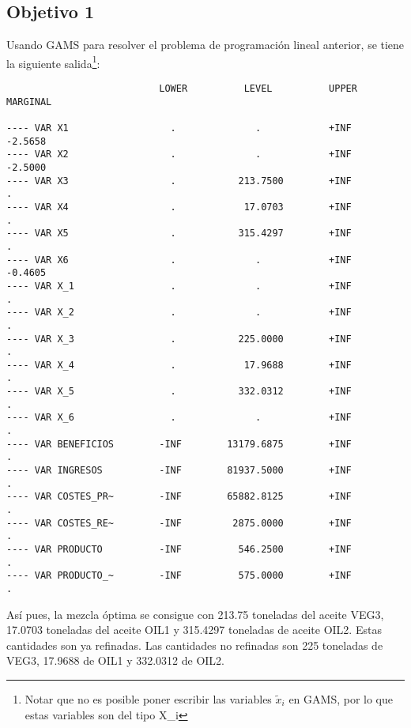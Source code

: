 \documentclass[12pt,a4paper,twoside,openright,titlepage,final]{article}
\begin{document}
\subsection{Objetivo 1}

Usando GAMS para resolver el problema de programación lineal anterior, se tiene la siguiente salida\footnote{Notar que no es posible poner escribir las variables $\tilde{x}_i$ en GAMS, por lo que estas variables son del tipo X\_i}:

\begin{verbatim}
                           LOWER          LEVEL          UPPER         MARGINAL

---- VAR X1                  .              .            +INF           -2.5658      
---- VAR X2                  .              .            +INF           -2.5000      
---- VAR X3                  .           213.7500        +INF             .          
---- VAR X4                  .            17.0703        +INF             .          
---- VAR X5                  .           315.4297        +INF             .          
---- VAR X6                  .              .            +INF           -0.4605      
---- VAR X_1                 .              .            +INF             .          
---- VAR X_2                 .              .            +INF             .       
---- VAR X_3                 .           225.0000        +INF             .          
---- VAR X_4                 .            17.9688        +INF             .          
---- VAR X_5                 .           332.0312        +INF             .          
---- VAR X_6                 .              .            +INF             .          
---- VAR BENEFICIOS        -INF        13179.6875        +INF             .          
---- VAR INGRESOS          -INF        81937.5000        +INF             .          
---- VAR COSTES_PR~        -INF        65882.8125        +INF             .          
---- VAR COSTES_RE~        -INF         2875.0000        +INF             .          
---- VAR PRODUCTO          -INF          546.2500        +INF             .          
---- VAR PRODUCTO_~        -INF          575.0000        +INF             .             
\end{verbatim}

Así pues, la mezcla óptima se consigue con 213.75 toneladas del aceite VEG3, 17.0703 toneladas del aceite OIL1 y 315.4297 toneladas de aceite OIL2. Estas cantidades son ya refinadas. Las cantidades no refinadas son 225 toneladas de VEG3, 17.9688 de OIL1 y 332.0312 de OIL2.\\
\end{document}
